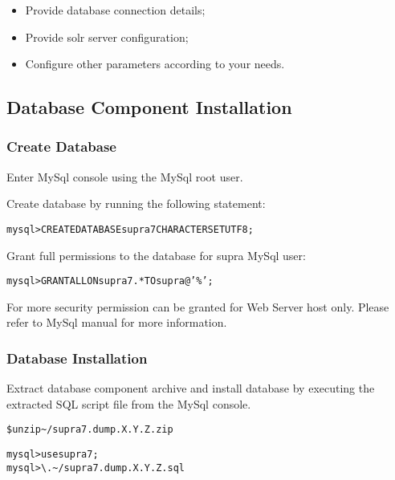 \documentclass[12pt]{article}
\newcommand{\vigProjectNameShort}{supra7}
\newcommand{\vigPackageName}{supra7}
\newcommand{\vigReleasePath}{\textasciitilde/}
\newcommand{\vigReleaseVersion}{X.Y.Z}
\begin{document}
\begin{itemize}
	\item Provide database connection details;
	\item Provide \textsf{solr} server configuration;
	\item Configure other parameters according to your needs.
\end{itemize}

\subsection{Database Component Installation}

\subsubsection{Create Database}

Enter MySql console using the MySql root user.

Create database by running the following statement:

\begin{alltt}
mysql> CREATE DATABASE \vigProjectNameShort CHARACTER SET UTF8;
\end{alltt}

Grant full permissions to the database for \textsf{supra} MySql user:

\begin{alltt}
mysql> GRANT ALL ON \vigProjectNameShort.* TO supra@'\%';
\end{alltt}

For more security permission can be granted for Web Server host only. Please refer to MySql manual for more information.

\subsubsection{Database Installation}
Extract database component archive and install database by executing the extracted SQL script file from the MySql console.

\begin{alltt}
\$ unzip {\vigReleasePath}{\vigPackageName}.dump.\vigReleaseVersion.zip
\end{alltt}

\begin{alltt}
mysql> use \vigProjectNameShort;
mysql> \textbackslash. {\vigReleasePath}{\vigPackageName}.dump.\vigReleaseVersion.sql
\end{alltt}
\end{document}
